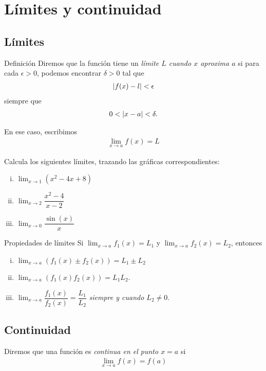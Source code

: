 \section{Límites y continuidad}

\subsection{Límites}
{Definición}
 Diremos que la función tiene un \emph{límite $L$ cuando $x$ aproxima $a$} si para cada $\epsilon >0$, podemos encontrar $\delta >0$ tal que 
 \begin{align}
  \left|f(x)-l\right| < \epsilon
  \end{align}
siempre que 
\begin{align}
 0 < \left|x-a\right| < \delta.
 \end{align}

{}
  En ese caso, escribimos
  \begin{align}
   \lim_{x \to a} f(x) = L
   \end{align}

{}
  \begin{problema}
   Calcula los siguientes límites, trazando las gráficas correspondientes:
   \begin{enumerate}[(i)]
     \item $\lim_{x\to 1}\left( x^{2}-4x+8 \right)$      
     \item $\lim_{x\to 2}\dfrac{x^{2}-4}{x-2}$      
     \item $\lim_{x\to 0}\dfrac{\sin(x)}{x}$ 
\end{enumerate}
  \end{problema}


{Propiedades de límites}
  Si $\lim_{x \to a}f_{1}(x)= L_{1}$ y $\lim_{x \to a }f_{2}(x)= L_{2}$, entonces
  \begin{enumerate}[(i)]
    \item $\lim_{x\to a}\left( f_{1}(x)\pm f_{2}(x) \right) = L_{1}\pm L_{2}$     
    \item $\lim_{x\to a}\left( f_{1}(x) f_{2}(x)\right)= L_{1}L_{2}$.    
    \item 
    $\lim_{x \to a}\dfrac{f_{1}(x)}{f_{2}(x)} = \dfrac{L_{1}}{L_{2}}$ 
    \emph{siempre y cuando $L_{2}\neq 0$}.
\end{enumerate}

\subsection{Continuidad}
{}
  Diremos que una función es \emph{continua en el punto $x=a$} si 
  \begin{align}
   \lim_{x\to a} f(x)=f(a)
   \end{align}

